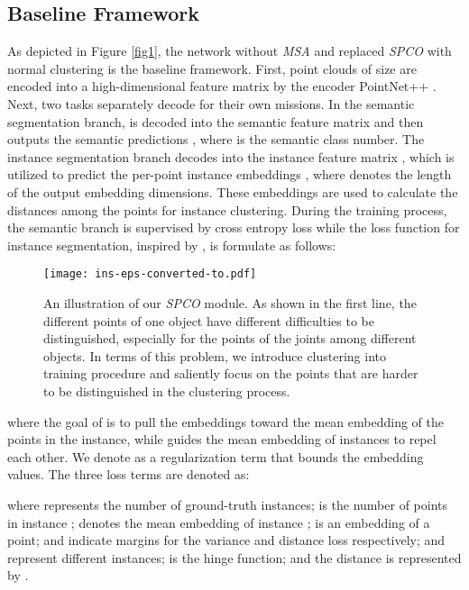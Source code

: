\documentclass{cta-author}
\begin{document}
\subsection{Baseline Framework}
\label{issue}
As depicted in Figure \ref{fig1}, the network without \textit{MSA} and replaced \textit{SPCO} with normal clustering is the baseline framework.
First, point clouds of size  are encoded into a high-dimensional feature matrix  by the encoder PointNet++ \cite{qi2017pointnet++}.
Next, two tasks separately decode  for their own missions. In the semantic segmentation branch,  is decoded into the semantic feature matrix  and then outputs the semantic predictions , where  is the semantic class number.
The instance segmentation branch decodes  into the instance feature matrix , which is utilized to predict the per-point instance embeddings , where  denotes the length of the output embedding dimensions. These embeddings are used to calculate the distances among the points for instance clustering.
During the training process, the semantic branch is supervised by cross entropy loss while the loss function for instance segmentation, inspired by \cite{wang2019associatively}, is formulate as follows:

\begin{figure}[t]
  \begin{center}
   \texttt{[image: ins-eps-converted-to.pdf]}
  \end{center}
  \caption{An illustration of our \textit{SPCO} module. As shown in the first line, the different points of one object have different difficulties to be distinguished, especially for the points of the joints among different objects. In terms of this problem, we introduce clustering into training procedure and saliently focus on the points that are harder to be distinguished in the clustering process.}
  \label{fig3}
\end{figure}
where the goal of  is to pull the embeddings toward the mean embedding of the points in the instance, while  guides the mean embedding of instances to repel each other. We denote  as a regularization term that bounds the embedding values.
The three loss terms are denoted as:



where  represents the number of ground-truth instances;  is the number of points in instance ;  denotes the mean embedding of instance ;  is an embedding of a point;  and  indicate margins for the variance and distance loss respectively;  and  represent different instances;  is the hinge function; and the  distance is represented by .
\end{document}
